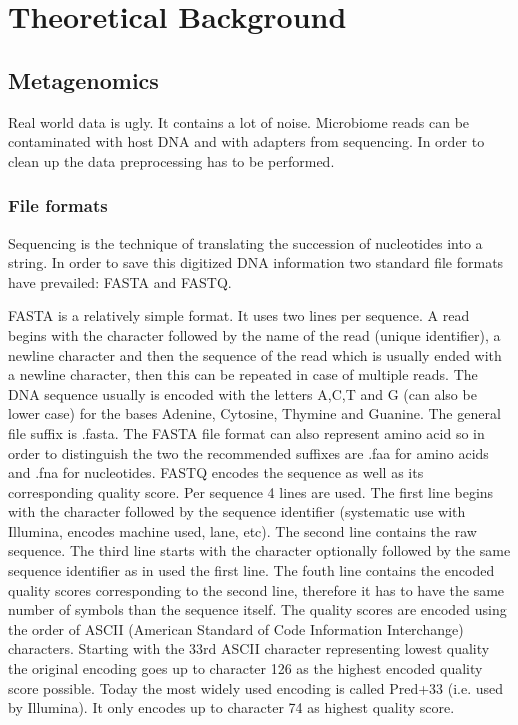 \chapter{Theoretical Background} 

\label{theory} 



\section{Metagenomics}

Real world data is ugly. It contains a lot of noise. Microbiome reads can be contaminated with host DNA and with adapters from sequencing. In order to clean up the data preprocessing has to be performed. 



	\subsection{File formats}
Sequencing is the technique of translating the succession of nucleotides into a string. In order to save this digitized DNA information two standard file formats have prevailed: FASTA and FASTQ. 

FASTA is a relatively simple format. It uses two lines per sequence. A read begins with the character \code{>} followed by the name of the read (unique identifier), a newline character  and then the sequence of the read which is usually ended with a newline character, then this can be repeated in case of multiple reads. The DNA sequence usually is encoded with the letters A,C,T and G (can also be lower case) for the bases Adenine, Cytosine, Thymine and Guanine.
The general file suffix is .fasta. The FASTA file format can also represent amino acid so in order to distinguish the two the recommended suffixes are .faa for amino acids and .fna for nucleotides.
FASTQ encodes the sequence as well as its corresponding quality score. Per sequence 4 lines are used. 
The first line begins with the  character followed by the sequence identifier (systematic use with Illumina, encodes machine used, lane, etc).
The second line contains the raw sequence.
The third line starts with the \code{+} character optionally followed by the same sequence identifier as in used the first line.
The fouth line contains the encoded quality scores corresponding to the second line, therefore it has to have the same number of symbols than the sequence itself.
The quality scores are encoded using the order of ASCII (American Standard of Code Information Interchange) characters. Starting with the 33rd ASCII character \code{!} representing lowest quality the original encoding goes up to character 126 \code{\textasciitilde} as the highest encoded quality score possible. Today the most widely used encoding is called Pred+33 (i.e. used by Illumina). It only encodes up to character 74  as highest quality score.

